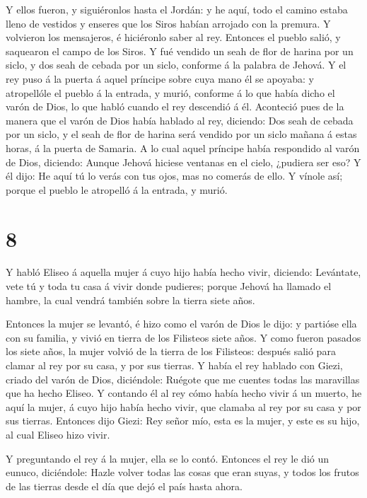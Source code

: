  Y ellos fueron, y siguiéronlos hasta el Jordán: y he aquí,
todo el camino estaba lleno de vestidos y enseres que los Siros habían
arrojado con la premura. Y volvieron los mensajeros, é hiciéronlo saber
al rey.  Entonces el pueblo salió, y saquearon el campo de
los Siros. Y fué vendido un seah de flor de harina por un siclo, y dos
seah de cebada por un siclo, conforme á la palabra de Jehová.
 Y el rey puso á la puerta á aquel príncipe sobre cuya mano
él se apoyaba: y atropellóle el pueblo á la entrada, y murió, conforme á
lo que había dicho el varón de Dios, lo que habló cuando el rey
descendió á él.  Aconteció pues de la manera que el varón
de Dios había hablado al rey, diciendo: Dos seah de cebada por un siclo,
y el seah de flor de harina será vendido por un siclo mañana á estas
horas, á la puerta de Samaria.  A lo cual aquel príncipe
había respondido al varón de Dios, diciendo: Aunque Jehová hiciese
ventanas en el cielo, ¿pudiera ser eso? Y él dijo: He aquí tú lo verás
con tus ojos, mas no comerás de ello.  Y vínole así; porque
el pueblo le atropelló á la entrada, y murió.

\hypertarget{section-7}{%
\section{8}\label{section-7}}

 Y habló Eliseo á aquella mujer á cuyo hijo había hecho
vivir, diciendo: Levántate, vete tú y toda tu casa á vivir donde
pudieres; porque Jehová ha llamado el hambre, la cual vendrá también
sobre la tierra siete años.

 Entonces la mujer se levantó, é hizo como el varón de Dios
le dijo: y partióse ella con su familia, y vivió en tierra de los
Filisteos siete años.  Y como fueron pasados los siete años,
la mujer volvió de la tierra de los Filisteos: después salió para clamar
al rey por su casa, y por sus tierras.  Y había el rey
hablado con Giezi, criado del varón de Dios, diciéndole: Ruégote que me
cuentes todas las maravillas que ha hecho Eliseo.  Y
contando él al rey cómo había hecho vivir á un muerto, he aquí la mujer,
á cuyo hijo había hecho vivir, que clamaba al rey por su casa y por sus
tierras. Entonces dijo Giezi: Rey señor mío, esta es la mujer, y este es
su hijo, al cual Eliseo hizo vivir.

 Y preguntando el rey á la mujer, ella se lo contó. Entonces
el rey le dió un eunuco, diciéndole: Hazle volver todas las cosas que
eran suyas, y todos los frutos de las tierras desde el día que dejó el
país hasta ahora.

